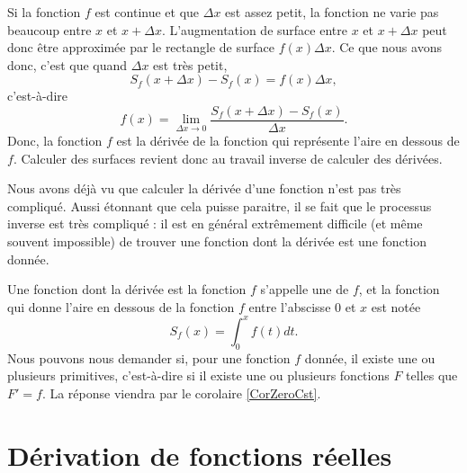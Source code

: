 Si la fonction \( f\) est continue et que \( \Delta x\) est assez petit, la fonction ne varie pas beaucoup entre \( x\) et \( x+\Delta x\). L'augmentation de surface entre \( x\) et \( x+\Delta x\) peut donc être approximée par le rectangle de surface \( f(x)\Delta x\). Ce que nous avons donc, c'est que quand \( \Delta x\) est très petit,
\begin{equation}
	S_f(x+\Delta x)-S_f(x)=f(x)\Delta x,
\end{equation}
c'est-à-dire
\begin{equation}
	f(x)=\lim_{\Delta x\to 0}\frac{  S_f(x+\Delta x)-S_f(x)}{ \Delta x }.
\end{equation}
Donc, la fonction \( f\) est la dérivée de la fonction qui représente l'aire en dessous de \( f\). Calculer des surfaces revient donc au travail inverse de calculer des dérivées.

Nous avons déjà vu que calculer la dérivée d'une fonction n'est pas très compliqué. Aussi étonnant que cela puisse paraitre, il se fait que le processus inverse est très compliqué : il est en général extrêmement difficile (et même souvent impossible) de trouver une fonction dont la dérivée est une fonction donnée.

Une fonction dont la dérivée est la fonction \( f\) s'appelle une  de \( f\), et la fonction qui donne l'aire en dessous de la fonction \( f\) entre l'abscisse \( 0\) et \( x\) est notée
\begin{equation}
	S_f(x)=\int_0^xf(t)dt.
\end{equation}
Nous pouvons nous demander si, pour une fonction \( f\) donnée, il existe une ou plusieurs primitives, c'est-à-dire si il existe une ou plusieurs fonctions \( F\) telles que \( F'=f\). La réponse viendra par le corolaire \ref{CorZeroCst}.

\section{Dérivation de fonctions réelles}
\label{seccontetderiv}

